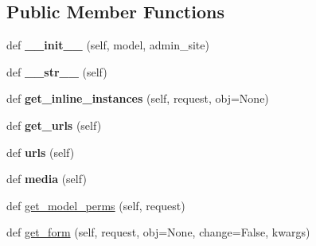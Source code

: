 \subsection*{Public Member Functions}
\begin{DoxyCompactItemize}
\item 
\mbox{\label{classdjango_1_1contrib_1_1admin_1_1options_1_1_model_admin_ad481694015dda0bedf9350d1b7fdfcdb}} 
def {\bfseries \+\_\+\+\_\+init\+\_\+\+\_\+} (self, model, admin\+\_\+site)
\item 
\mbox{\label{classdjango_1_1contrib_1_1admin_1_1options_1_1_model_admin_a749484780c019fd0d5f19cceaa74033a}} 
def {\bfseries \+\_\+\+\_\+str\+\_\+\+\_\+} (self)
\item 
\mbox{\label{classdjango_1_1contrib_1_1admin_1_1options_1_1_model_admin_aa885ca281195676b671750365056251c}} 
def {\bfseries get\+\_\+inline\+\_\+instances} (self, request, obj=None)
\item 
\mbox{\label{classdjango_1_1contrib_1_1admin_1_1options_1_1_model_admin_abb863eb8bd16bc64644d6648d1ab0995}} 
def {\bfseries get\+\_\+urls} (self)
\item 
\mbox{\label{classdjango_1_1contrib_1_1admin_1_1options_1_1_model_admin_a6435891c5d3823d49fe9cada5e62eb53}} 
def {\bfseries urls} (self)
\item 
\mbox{\label{classdjango_1_1contrib_1_1admin_1_1options_1_1_model_admin_a78a3779b72d0542e663e54402fb6d7fa}} 
def {\bfseries media} (self)
\item 
def \mbox{\hyperlink{classdjango_1_1contrib_1_1admin_1_1options_1_1_model_admin_a8367954850e2693afe42cf730ef76aff}{get\+\_\+model\+\_\+perms}} (self, request)
\item 
def \mbox{\hyperlink{classdjango_1_1contrib_1_1admin_1_1options_1_1_model_admin_a28e648d80373f8b20ceaf47e77836557}{get\+\_\+form}} (self, request, obj=None, change=False, kwargs)
\item 

\end{DoxyCompactItemize}
